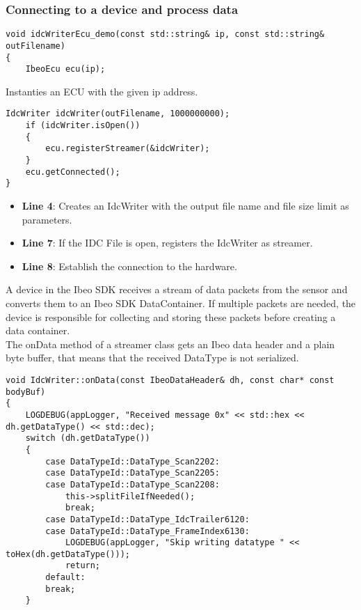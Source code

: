 \subsubsection{Connecting to a device and process data}
\begin{lstlisting}
void idcWriterEcu_demo(const std::string& ip, const std::string& outFilename)
{
	IbeoEcu ecu(ip);
\end{lstlisting}
Instanties an ECU with the given ip address.
\begin{lstlisting}[firstnumber=last]
	IdcWriter idcWriter(outFilename, 1000000000);
	if (idcWriter.isOpen())
	{
		ecu.registerStreamer(&idcWriter);
	}
	ecu.getConnected();
}
\end{lstlisting}
\begin{itemize}
	\item \textbf{Line 4}: Creates an IdcWriter with the output file name and file size limit as parameters.
	\item \textbf{Line 7}: If the IDC File is open, registers the IdcWriter as streamer.
	\item \textbf{Line 8}: Establish the connection to the hardware.
\end{itemize}
A device in the Ibeo SDK receives a stream of data packets from the sensor and converts them to an Ibeo SDK DataContainer. If multiple packets are needed, the device is responsible for collecting and storing these packets before creating a data container. \\
The onData method of a streamer class gets an Ibeo data header and a plain byte buffer, that means that the received DataType is not serialized. 

\newpage
\begin{lstlisting}
void IdcWriter::onData(const IbeoDataHeader& dh, const char* const bodyBuf)
{
	LOGDEBUG(appLogger, "Received message 0x" << std::hex << dh.getDataType() << std::dec);
	switch (dh.getDataType())
	{
		case DataTypeId::DataType_Scan2202:
		case DataTypeId::DataType_Scan2205:
		case DataTypeId::DataType_Scan2208:
			this->splitFileIfNeeded();
			break;
		case DataTypeId::DataType_IdcTrailer6120:
		case DataTypeId::DataType_FrameIndex6130:
			LOGDEBUG(appLogger, "Skip writing datatype " << toHex(dh.getDataType()));
			return;
		default:
		break;
	}
\end{lstlisting}
